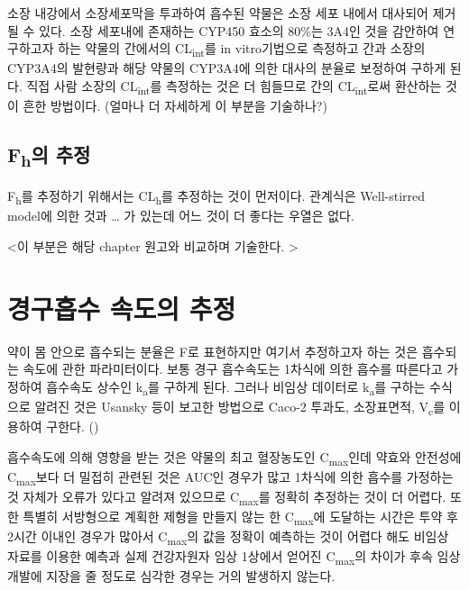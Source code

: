 \documentclass[
  11pt,
  krantz2, a4paper, twoside]{krantz}
\begin{document}
소장 내강에서 소장세포막을 투과하여 흡수된 약물은 소장 세포 내에서 대사되어 제거될 수 있다.
소장 세포내에 존재하는 CYP450 효소의 80\%는 3A4인 것을 감안하여 연구하고자 하는 약물의 간에서의 CL\textsubscript{int}를 in vitro기법으로 측정하고 간과 소장의 CYP3A4의 발현량과 해당 약물의 CYP3A4에 의한 대사의 분율로 보정하여 구하게 된다.
직접 사람 소장의 CL\textsubscript{int}를 측정하는 것은 더 힘들므로 간의 CL\textsubscript{int}로써 환산하는 것이 흔한 방법이다. (얼마나 더 자세하게 이 부분을 기술하나?)

\subsection{\texorpdfstring{F\textsubscript{h}의 추정}{Fh의 추정}}\label{fhuxc758-uxcd94uxc815}

F\textsubscript{h}를 추정하기 위해서는 CL\textsubscript{h}를 추정하는 것이 먼저이다. 관계식은 Well-stirred model에 의한 것과 \ldots{} 가 있는데 어느 것이 더 좋다는 우열은 없다.

\textless 이 부분은 해당 chapter 원고와 비교하며 기술한다. \textgreater{}

\section{경구흡수 속도의 추정}\label{uxacbduxad6cuxd761uxc218-uxc18duxb3c4uxc758-uxcd94uxc815}

약이 몸 안으로 흡수되는 분율은 F로 표현하지만 여기서 추정하고자 하는 것은 흡수되는 속도에 관한 파라미터이다. 보통 경구 흡수속도는 1차식에 의한 흡수를 따른다고 가정하여 흡수속도 상수인 k\textsubscript{a}를 구하게 된다.
그러나 비임상 데이터로 k\textsubscript{a}를 구하는 수식으로 알려진 것은 Usansky 등이 보고한 방법으로 Caco-2 투과도, 소장표면적, V\textsubscript{c}를 이용하여 구한다. ()

흡수속도에 의해 영향을 받는 것은 약물의 최고 혈장농도인 C\textsubscript{max}인데 약효와 안전성에 C\textsubscript{max}보다 더 밀접히 관련된 것은 AUC인 경우가 많고 1차식에 의한 흡수를 가정하는 것 자체가 오류가 있다고 알려져 있으므로 C\textsubscript{max}를 정확히 추정하는 것이 더 어렵다.
또한 특별히 서방형으로 계획한 제형을 만들지 않는 한 C\textsubscript{max}에 도달하는 시간은 투약 후 2시간 이내인 경우가 많아서 C\textsubscript{max}의 값을 정확이 예측하는 것이 어렵다 해도 비임상 자료를 이용한 예측과 실제 건강자원자 임상 1상에서 얻어진 C\textsubscript{max}의 차이가 후속 임상개발에 지장을 줄 정도로 심각한 경우는 거의 발생하지 않는다.
\end{document}
